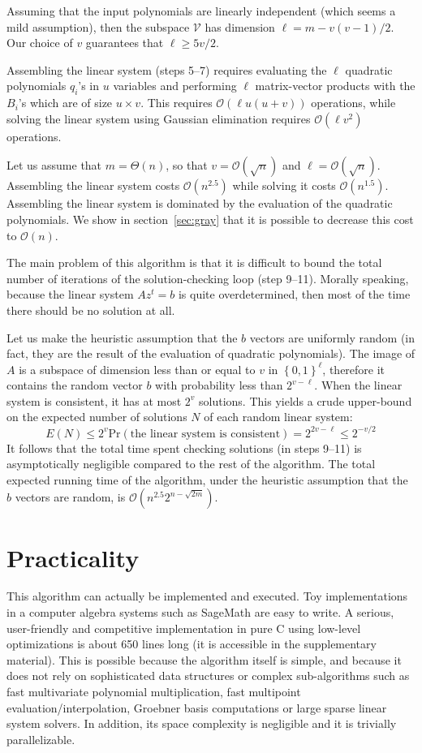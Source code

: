 \documentclass[a4paper,UKenglish,cleveref, autoref]{lipics-v2019}
\newcommand{\bits}{\left\{0, 1\right\}}
\newcommand{\bigO}[1]{\ensuremath{\mathcal{O}\left( #1 \right)} }
\newcommand{\bigTheta}[1]{\ensuremath{\Theta\left( #1 \right)} }
\begin{document}
	Assuming that the input polynomials are linearly independent (which seems a mild
	assumption), then the subspace $\mathcal{V}$ has dimension
	$\ell = m - v(v-1)/2$. Our choice of $v$ guarantees that $\ell \geq 5v/2$.
	
	Assembling the linear system (steps 5--7) requires evaluating the $\ell$
	quadratic polynomials $q_i$'s in $u$ variables and performing $\ell$
	matrix-vector products with the $B_i$'s which are of size $u \times v$.  This
	requires $\bigO{\ell u(u+v)}$ operations, while solving the linear system using
	Gaussian elimination requires $\bigO{\ell v^2}$ operations.
	
	Let us assume that $m = \bigTheta{n}$, so that $v = \bigO{\sqrt{n}}$ and
	$\ell = \bigO{\sqrt{n}}$. Assembling the linear system costs $\bigO{n^{2.5}}$
	while solving it costs $\bigO{n^{1.5}}$. Assembling the linear system is
	dominated by the evaluation of the quadratic polynomials. We show in
	section~\ref{sec:gray} that it is possible to decrease this cost to $\bigO{n}$.
	
	The main problem of this algorithm is that it is difficult to bound the total
	number of iterations of the solution-checking loop (step 9--11). Morally
	speaking, because the linear system $A z^t = b$ is quite overdetermined, then most
	of the time there should be no solution at all.
	
	Let us make the heuristic assumption that the $b$ vectors are uniformly random
	(in fact, they are the result of the evaluation of quadratic polynomials). The
	image of $A$ is a subspace of dimension less than or equal to $v$ in
	$\bits^\ell$, therefore it contains the random vector $b$ with probability less
	than $2^{v-\ell}$. When the linear system is consistent, it has at most $2^v$
	solutions. This yields a crude upper-bound on the expected number of solutions
	$N$ of each random linear system:
	\[
	E(N) \leq 2^v \mathrm{Pr}(\text{the linear system is consistent}) = 2^{2v - \ell} \leq 2^{-v/2}
	\]
	It follows that the total time spent checking solutions (in steps 9--11) is
	asymptotically negligible compared to the rest of the algorithm.  The total
	expected running time of the algorithm, under the heuristic assumption that the
	$b$ vectors are random, is $\bigO{n^{2.5} 2^{n - \sqrt{2m}}}$.
	
	
	\section{Practicality}
	
	This algorithm can actually be implemented and executed. Toy implementations in
	a computer algebra systems such as \textsf{SageMath} are easy to write. A
	serious, user-friendly and competitive implementation in pure C using low-level
	optimizations is about 650 lines long (it is accessible in the supplementary
	material). This is possible because the algorithm itself is simple, and because
	it does not rely on sophisticated data structures or complex sub-algorithms such
	as fast multivariate polynomial multiplication, fast multipoint
	evaluation/interpolation, Groebner basis computations or large sparse linear
	system solvers. In addition, its space complexity is negligible and it is
	trivially parallelizable.
	
\end{document}
